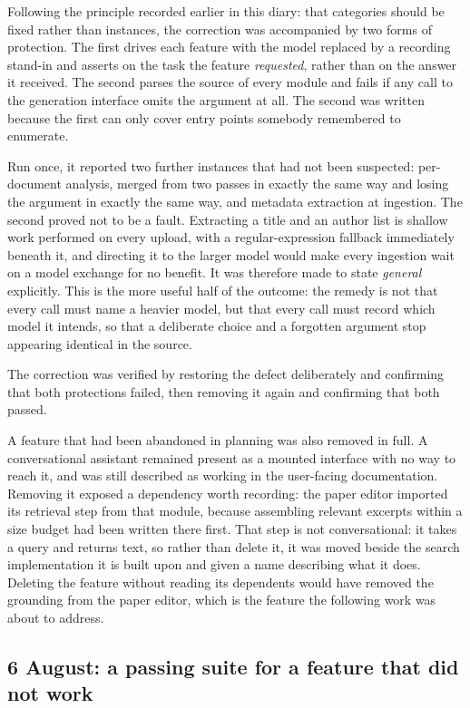 \documentclass[11pt,a4paper]{article}
\begin{document}
Following the principle recorded earlier in this diary: that categories
should be fixed rather than instances, the correction was accompanied by two
forms of protection. The first drives each feature with the model replaced by a
recording stand-in and asserts on the task the feature \emph{requested}, rather
than on the answer it received. The second parses the source of every module and
fails if any call to the generation interface omits the argument at all. The
second was written because the first can only cover entry points somebody
remembered to enumerate.

Run once, it reported two further instances that had not been suspected:
per-document analysis, merged from two passes in exactly the same way and losing
the argument in exactly the same way, and metadata extraction at ingestion. The
second proved not to be a fault. Extracting a title and an author list is
shallow work performed on every upload, with a regular-expression fallback
immediately beneath it, and directing it to the larger model would make every
ingestion wait on a model exchange for no benefit. It was therefore made to
state \emph{general} explicitly. This is the more useful half of the outcome:
the remedy is not that every call must name a heavier model, but that every call
must record which model it intends, so that a deliberate choice and a forgotten
argument stop appearing identical in the source.

The correction was verified by restoring the defect deliberately and confirming
that both protections failed, then removing it again and confirming that both
passed.

A feature that had been abandoned in planning was also removed in full. A
conversational assistant remained present as a mounted interface with no way to
reach it, and was still described as working in the user-facing documentation.
Removing it exposed a dependency worth recording: the paper editor imported its
retrieval step from that module, because assembling relevant excerpts within a
size budget had been written there first. That step is not conversational: it
takes a query and returns text, so rather than delete it, it was moved beside
the search implementation it is built upon and given a name describing what it
does. Deleting the feature without reading its dependents would have removed
the grounding from the paper editor, which is the feature the following work was
about to address.


\subsection{6 August: a passing suite for a feature that did not work}
\end{document}
